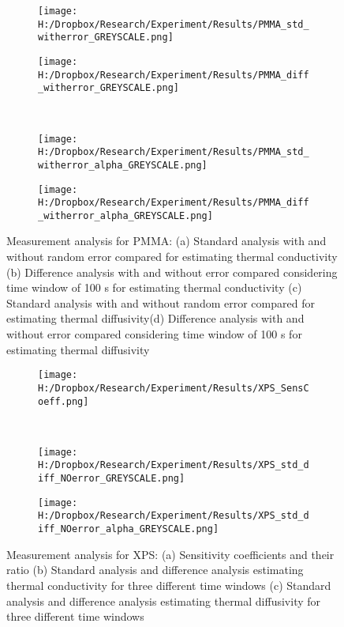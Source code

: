 \documentclass[12pt]{report}
\begin{document}
\begin{figure}
\begin{subfigure}{.5\textwidth}
\centering
\texttt{[image: H:/Dropbox/Research/Experiment/Results/PMMA\_std\_witherror\_GREYSCALE.png]}
\caption{}
\end{subfigure}\hfill
\begin{subfigure}{.5\textwidth}
\centering
\texttt{[image: H:/Dropbox/Research/Experiment/Results/PMMA\_diff\_witherror\_GREYSCALE.png]}
\caption{}
\end{subfigure}\\
\begin{subfigure}{.5\textwidth}
\centering
\texttt{[image: H:/Dropbox/Research/Experiment/Results/PMMA\_std\_witherror\_alpha\_GREYSCALE.png]}
\caption{}
\end{subfigure}\hfill
\begin{subfigure}{.5\textwidth}
\centering
\texttt{[image: H:/Dropbox/Research/Experiment/Results/PMMA\_diff\_witherror\_alpha\_GREYSCALE.png]}
\caption{}
\end{subfigure}
\caption{Measurement analysis for PMMA: (a) Standard analysis with and without random error compared for estimating thermal conductivity (b) Difference analysis with and without error compared considering time window of 100 s for estimating thermal conductivity (c) Standard analysis with and without random error compared for estimating thermal diffusivity(d) Difference analysis with and without error compared considering time window of 100 s for estimating thermal diffusivity}

\end{figure}


\begin{figure}
\begin{subfigure}{1\textwidth}
\centering
\texttt{[image: H:/Dropbox/Research/Experiment/Results/XPS\_SensCoeff.png]}
\caption{}
\end{subfigure}\\
\begin{subfigure}{.5\textwidth}
\centering
\texttt{[image: H:/Dropbox/Research/Experiment/Results/XPS\_std\_diff\_NOerror\_GREYSCALE.png]}
\caption{}
\end{subfigure}\hfill
\begin{subfigure}{.5\textwidth}
\centering
\texttt{[image: H:/Dropbox/Research/Experiment/Results/XPS\_std\_diff\_NOerror\_alpha\_GREYSCALE.png]}
\caption{}
\end{subfigure}
\caption{Measurement analysis for XPS: (a) Sensitivity coefficients and their ratio (b) Standard analysis and difference analysis estimating thermal conductivity for three different time windows (c) Standard analysis and difference analysis estimating thermal diffusivity for three different time windows}

\end{figure}
\end{document}
